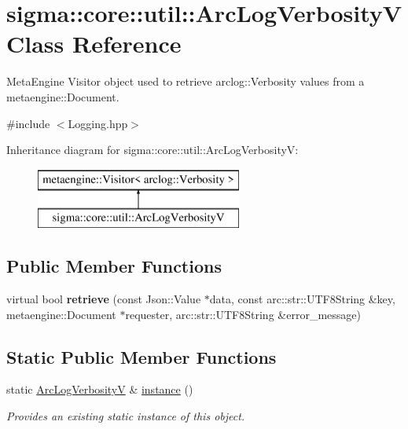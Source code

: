 \hypertarget{classsigma_1_1core_1_1util_1_1_arc_log_verbosity_v}{}\section{sigma\+:\+:core\+:\+:util\+:\+:Arc\+Log\+Verbosity\+V Class Reference}
\label{classsigma_1_1core_1_1util_1_1_arc_log_verbosity_v}


Meta\+Engine Visitor object used to retrieve arclog\+::\+Verbosity values from a metaengine\+::\+Document.  




{\ttfamily \#include $<$Logging.\+hpp$>$}

Inheritance diagram for sigma\+:\+:core\+:\+:util\+:\+:Arc\+Log\+Verbosity\+V\+:\begin{figure}[H]
\begin{center}
\leavevmode
\includegraphics[height=2.000000cm]{classsigma_1_1core_1_1util_1_1_arc_log_verbosity_v}
\end{center}
\end{figure}
\subsection*{Public Member Functions}
\begin{DoxyCompactItemize}
\item 
\hypertarget{classsigma_1_1core_1_1util_1_1_arc_log_verbosity_v_a453ad055aba8e0813512ac3fe1f3a934}{}virtual bool {\bfseries retrieve} (const Json\+::\+Value $\ast$data, const arc\+::str\+::\+U\+T\+F8\+String \&key, metaengine\+::\+Document $\ast$requester, arc\+::str\+::\+U\+T\+F8\+String \&error\+\_\+message)\label{classsigma_1_1core_1_1util_1_1_arc_log_verbosity_v_a453ad055aba8e0813512ac3fe1f3a934}

\end{DoxyCompactItemize}
\subsection*{Static Public Member Functions}
\begin{DoxyCompactItemize}
\item 
\hypertarget{classsigma_1_1core_1_1util_1_1_arc_log_verbosity_v_a548692ff6183e2e7ba6e303773c95f02}{}static \hyperlink{classsigma_1_1core_1_1util_1_1_arc_log_verbosity_v}{Arc\+Log\+Verbosity\+V} \& \hyperlink{classsigma_1_1core_1_1util_1_1_arc_log_verbosity_v_a548692ff6183e2e7ba6e303773c95f02}{instance} ()\label{classsigma_1_1core_1_1util_1_1_arc_log_verbosity_v_a548692ff6183e2e7ba6e303773c95f02}

\begin{DoxyCompactList}\small\item\em Provides an existing static instance of this object. \end{DoxyCompactList}\end{DoxyCompactItemize}


